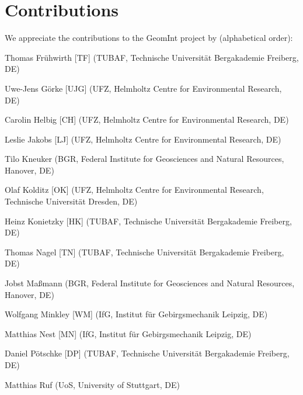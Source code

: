 \chapter*{Contributions}

We appreciate the contributions to the GeomInt project by  (alphabetical order):

\begin{list}{-}{\leftmargin=1em \itemindent=0em \itemsep=0.1em}

\item Thomas Fr\"uhwirth [TF] (TUBAF, Technische Universit\"at Bergakademie Freiberg, DE)	

\item Uwe-Jens G\"orke [UJG] (UFZ, Helmholtz Centre for Environmental Research, DE)	

\item Carolin Helbig [CH] (UFZ, Helmholtz Centre for Environmental Research, DE)	

\item Leslie Jakobs [LJ] (UFZ, Helmholtz Centre for Environmental Research, DE)

\item Tilo Kneuker (BGR, Federal Institute for Geosciences and Natural Resources, Hanover, DE)

\item Olaf Kolditz [OK] (UFZ, Helmholtz Centre for Environmental Research, Technische Universität Dresden, DE) 

\item Heinz Konietzky [HK] (TUBAF, Technische Universit\"at Bergakademie Freiberg, DE)	

\item Thomas Nagel [TN] (TUBAF, Technische Universit\"at Bergakademie Freiberg, DE) 

\item Jobst Ma{\ss}mann (BGR, Federal Institute for Geosciences and Natural Resources, Hanover, DE)

\item Wolfgang Minkley [WM] (IfG, Institut für Gebirgsmechanik Leipzig, DE)	

\item Matthias Nest [MN] (IfG, Institut für Gebirgsmechanik Leipzig, DE)	
\item Daniel P\"otschke [DP] (TUBAF, Technische Universit\"at Bergakademie Freiberg, DE)

\item Matthias Ruf (UoS, University of Stuttgart, DE)


\end{list}
